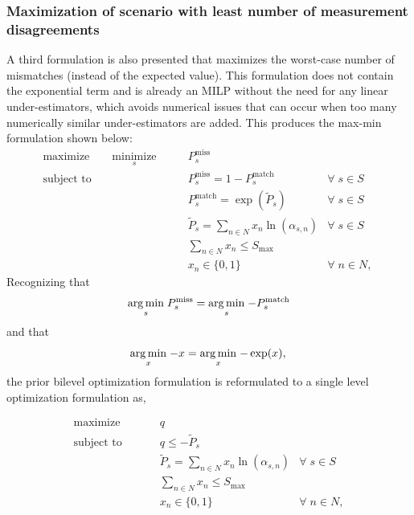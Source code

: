 \subsubsection{Maximization of scenario with least number of measurement disagreements}

A third formulation is also presented that maximizes the worst-case number of mismatches (instead of the expected value). This formulation does not contain the exponential term and is already an MILP without the need for any linear under-estimators, which avoids numerical issues that can occur when too many numerically similar
under-estimators are added. This produces the max-min formulation shown below:
\begin{align*}
\textrm{maximize} \qquad \underset{s}{\textrm{minimize}} \qquad & P_{s}^{\textrm{miss}} &  \label{eqn.p2_bi_obj}\\
\textrm{subject to} \qquad &P_{s}^{\textrm{miss}} = 1-P_{s}^{\textrm{match}} & \forall \; s \in S \label{eqn.p2_bi_c1}\\
&P_{s}^{\textrm{match}} = \exp(\tilde{P}_{s}) & \forall \; s \in S \label{eqn.p2_bi_c2}\\
&\tilde{P}_{s} =  \sum_{n\in N} x_n \ln(\alpha_{s,n}) & \forall \; s \in S \label{eqn.p2_bi_c3}\\
&\sum_{n\in N} x_n \le S_{\textrm{max}}  & \label{eqn.p2_bi_c4}\\
&x_{n} \in \{0,1\} & \forall \; n \in N, \label{eqn.p2_bi_c5}\
\end{align*}
Recognizing that 
\[
\underset{s} {\operatorname*{arg\,min}} \; P_{s}^{\textrm{miss}} = \underset{s}{\operatorname*{arg\,min}} \;{-}P_{s}^{\textrm{match}} \label{eqn.p2_arg1}\\
\] 
and that 
\[
\underset{x} {\operatorname*{arg\,min}} \; {-}x = \underset{x}{\operatorname*{arg\,min}} \; {-}\exp(x), \label{eqn.p2_arg2}\\
\]
the prior bilevel optimization formulation is reformulated to a single level optimization formulation as, 

\begin{align}
\textrm{maximize} \qquad & \;\; q &  \\
\textrm{subject to} \qquad & \;\;q \leq -\tilde{P}_{s} & \label{eqn.p2_obj}\\
&\;\; \tilde{P}_{s} =  \sum_{n\in N} x_n \ln(\alpha_{s,n}) & \forall \; s \in S \label{eqn.p2_c1}\\
&\;\; \sum_{n\in N} x_n \le S_{\textrm{max}}  & \label{eqn.p2_c2}\\
&\;\; x_{n} \in \{0,1\} & \forall \; n \in N, \label{eqn.p2_c3}
\end{align}

